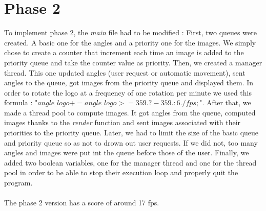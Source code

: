 \documentclass[a4paper, 11pt]{article}
\begin{document}
\section{Phase 2}
{\setlength{\parindent}{0pt}To implement phase 2, the \textit{main} file had to be modified :}
\newline\indent
First, two queues were created. A basic one for the angles and a priority one for the images. We simply chose to create a counter that increment each time an image is added to the priority queue and take the counter value as priority.
\newline\indent
Then, we created a manager thread. This one updated angles (user request or automatic movement), sent angles to the queue, got images from the priority queue and displayed them. In order to rotate the logo at a frequency of one rotation per minute we used this formula : "$angle\_logo += angle\_logo >= 359.? -359. : 6./fps;$".
\newline\indent
After that, we made a thread pool to compute images. It got angles from the queue, computed images thanks to the \textit{render} function and sent images associated with their priorities to the priority queue.
\newline\indent
Later, we had to limit the size of the basic queue and priority queue so as not to drown out user requests. If we did not, too many angles and images were put int the queue before those of the user.
\newline\indent
Finally, we added two boolean variables, one for the manager thread and one for the thread pool in order to be able to stop their execution loop and properly quit the program.
\\
\\
The phase 2 version has a score of around 17 fps.
\end{document}
